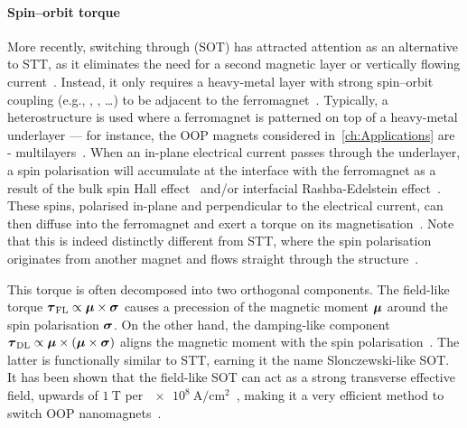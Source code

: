 \paragraph{Spin--orbit torque}
More recently, switching through  (SOT) has attracted attention as an alternative to STT, as it eliminates the need for a second magnetic layer or vertically flowing current~\cite{mumax3tutorial}.
Instead, it only requires a heavy-metal layer with strong spin--orbit coupling (e.g., , ,  \dots) to be adjacent to the ferromagnet~\cite{SOT_Roadmap}.
Typically, a heterostructure is used where a ferromagnet is patterned on top of a heavy-metal underlayer --- for instance, the OOP magnets considered in~\cref{ch:Applications} are - multilayers~\cite{KUR-24}. %
When an in-plane electrical current passes through the underlayer, a spin polarisation will accumulate at the interface with the ferromagnet as a result of the bulk spin Hall effect~\cite{SHE} and/or interfacial Rashba-Edelstein effect~\cite{SOT_Rashba}. %
These spins, polarised in-plane and perpendicular to the electrical current, can then diffuse into the ferromagnet and exert a torque on its magnetisation~\cite{mumax3tutorial}.
Note that this is indeed distinctly different from STT, where the spin polarisation originates from another magnet and flows straight through the structure~\cite{SOT_Roadmap}. \par
This torque is often decomposed into two orthogonal components.
The field-like torque $\boldsymbol{\mathbf{\tau}}_\mathrm{FL} \propto \boldsymbol{\mathbf{\mu}} \times \boldsymbol{\mathbf{\sigma}}$ causes a precession of the magnetic moment $\boldsymbol{\mathbf{\mu}}$ around the spin polarisation $\boldsymbol{\mathbf{\sigma}}$.
On the other hand, the damping-like component $\boldsymbol{\mathbf{\tau}}_\mathrm{DL} \propto \boldsymbol{\mathbf{\mu}} \times (\boldsymbol{\mathbf{\mu}} \times \boldsymbol{\mathbf{\sigma}})$ aligns the magnetic moment with the spin polarisation~\cite{SOT_Roadmap,SOT_FM_AFM}.
The latter is functionally similar to STT, earning it the name Slonczewski-like SOT.
It has been shown that the field-like SOT can act as a strong transverse effective field, upwards of $\SI{1}{\tesla}$ per $\SI{e8}{\ampere\per\centi\metre\squared}$~\cite{SOT_Rashba}, making it a very efficient method to switch OOP nanomagnets~\cite{vlasov2022optimal,SOTswitchingCoPt,SHE_CurrentInducedSwitching,SpintronicsEnergyEfficientComputing}. \par
